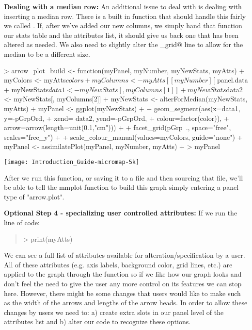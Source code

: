 \documentclass{article}
\begin{document}
\textbf{Dealing with a median row:} 
An additional issue to deal with is dealing with inserting a median row. There is a built in function that should handle this fairly we called \verb@alterForMedian@. If, after we've added our new columns, we simply hand that function our stats table and the attributes list, it should give us back one that has been altered as needed. We also need to slightly alter the \verb@facet_grid@ line to allow for the median to be a different size.

\begin{Schunk}
\begin{Sinput}
> arrow_plot_build <- function(myPanel, myNumber, myNewStats, myAtts){
+   myColors <- myAtts$colors
+   myColumns <- myAtts[[myNumber]]$panel.data
+   myNewStats$data1 <- myNewStats[, myColumns[1]]
+   myNewStats$data2 <- myNewStats[, myColumns[2]]
+   myNewStats <- alterForMedian(myNewStats, myAtts)
+   myPanel <- ggplot(myNewStats) +
+   geom_segment(aes(x=data1, y=-pGrpOrd,
+   xend= data2, yend=-pGrpOrd,
+   colour=factor(color)),
+   arrow=arrow(length=unit(0.1,"cm"))) +
+   facet_grid(pGrp~., space="free", scales="free_y") +
+   scale_colour_manual(values=myColors, guide="none")
+   myPanel <- assimilatePlot(myPanel, myNumber, myAtts)
+   }
> myPanel
\end{Sinput}
\end{Schunk}
\texttt{[image: Introduction\_Guide-micromap-5k]}

After we run this function, or saving it to a file and then sourcing that file, we'll be able to tell the mmplot function to build this graph simply entering a panel type of "arrow.plot".


\textbf{Optional Step 4 - specializing user controlled attributes:}
If we run the line of code:
\begin{quote}> print(myAtts)\end{quote}

We can see a full list of attributes available for alteration/specification by a user. All of these attributes (e.g. axis labels, background color, grid lines, etc.) are applied to the graph through the \verb@assimilatePlot@ function so if we like how our graph looks and don't feel the need to give the user any more control on its features we can stop here. However, there might be some changes that users would like to make such as the width of the arrows and lengths of the arrow heads. In order to allow these changes by users we need to: a) create extra slots in our panel level of the attributes list and b) alter our code to recognize these options.
\end{document}
